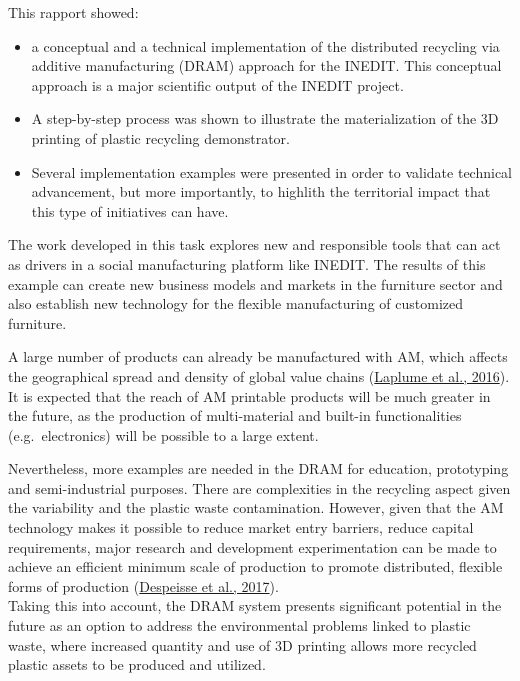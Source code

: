 \documentclass[
  11pt,
]{article}
\providecommand{\tightlist}{%
  \setlength{\itemsep}{0pt}\setlength{\parskip}{0pt}}\usepackage{longtable,booktabs,array}
\begin{document}
This rapport showed:

\begin{itemize}
\tightlist
\item
  a conceptual and a technical implementation of the distributed
  recycling via additive manufacturing (DRAM) approach for the INEDIT.
  This conceptual approach is a major scientific output of the INEDIT
  project.
\item
  A step-by-step process was shown to illustrate the materialization of
  the 3D printing of plastic recycling demonstrator.
\item
  Several implementation examples were presented in order to validate
  technical advancement, but more importantly, to highlith the
  territorial impact that this type of initiatives can have.
\end{itemize}

The work developed in this task explores new and responsible tools that
can act as drivers in a social manufacturing platform like INEDIT. The
results of this example can create new business models and markets in
the furniture sector and also establish new technology for the flexible
manufacturing of customized furniture.

A large number of products can already be manufactured with AM, which
affects the geographical spread and density of global value chains
(\protect\hyperlink{ref-Laplume2016}{Laplume et al., 2016}). It is
expected that the reach of AM printable products will be much greater in
the future, as the production of multi-material and built-in
functionalities (e.g.~electronics) will be possible to a large extent.

Nevertheless, more examples are needed in the DRAM for education,
prototyping and semi-industrial purposes. There are complexities in the
recycling aspect given the variability and the plastic waste
contamination. However, given that the AM technology makes it possible
to reduce market entry barriers, reduce capital requirements, major
research and development experimentation can be made to achieve an
efficient minimum scale of production to promote distributed, flexible
forms of production (\protect\hyperlink{ref-Despeisse2016}{Despeisse et
al., 2017}).\\
Taking this into account, the DRAM system presents significant potential
in the future as an option to address the environmental problems linked
to plastic waste, where increased quantity and use of 3D printing allows
more recycled plastic assets to be produced and utilized.
\end{document}
